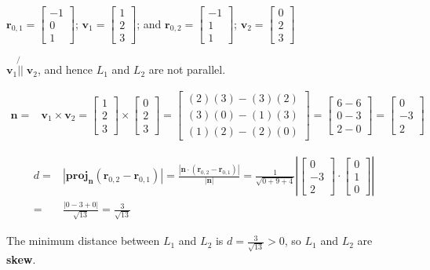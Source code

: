 \documentclass{article}
\newcommand{\abs}[1]{\left|#1\right|}
\newcommand{\colvec}[3]{\begin{bmatrix} #1 \\ #2 \\ #3 \end{bmatrix}}
\newcommand{\dr}[1]{\textcolor{dark_red}{#1}}
\begin{document}
\dr{\(\mathbf{r}_{0,1} = \colvec{-1}{0}{1}\); \(\mathbf{v}_1 = \colvec{1}{2}{3}\); and \(\mathbf{r}_{0,2} = \colvec{-1}{1}{1}\); \(\mathbf{v}_2 = \colvec{0}{2}{3}\)}

\dr{\(\mathbf{v}_1 \not{\!||}\; \mathbf{v}_2\), and hence \(L_1\) and \(L_2\) are not parallel.}

\dr{\begin{align*}
\mathbf{n} = & \mathbf{v}_1 \times \mathbf{v}_2 
= \colvec{1}{2}{3} \times \colvec{0}{2}{3} 
= \colvec{(2)(3) - (3)(2)}{(3)(0) - (1)(3)}{(1)(2) - (2)(0)} 
= \colvec{6 - 6}{0 - 3}{2 - 0} 
= \colvec{0}{-3}{2}
\end{align*}}

\dr{\begin{align*}
d = & \abs{\textbf{proj}_{\mathbf{n}}(\mathbf{r}_{0,2} - \mathbf{r}_{0,1})} 
= \frac{\abs{\mathbf{n} \cdot (\mathbf{r}_{0,2} - \mathbf{r}_{0,1})}}{\abs{\mathbf{n}}} 
= \frac{1}{\sqrt{0 + 9 + 4}}\abs{\colvec{0}{-3}{2} \cdot \colvec{0}{1}{0}} \\
= & \frac{\abs{0 - 3 + 0}}{\sqrt{13}} 
= \frac{3}{\sqrt{13}}
\end{align*}}

\dr{The minimum distance between \(L_1\) and \(L_2\) is \(d = \frac{3}{\sqrt{13}} > 0\), so \(L_1\) and \(L_2\) are \textbf{skew}.}
\end{document}
